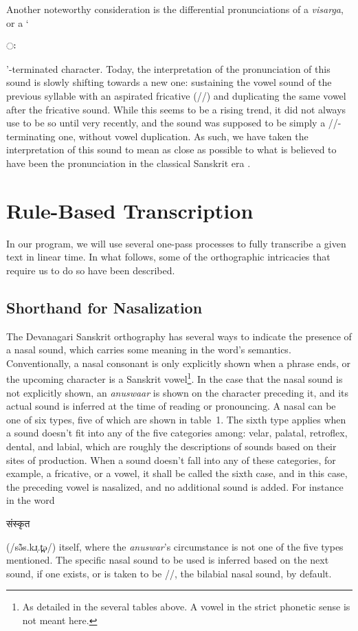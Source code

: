 \documentclass[10pt,a4paper]{article}
\let\ipa\textipa
\newcommand{\sansk}[1]{\begin{sanskrit}#1\end{sanskrit}}
\begin{document}
Another noteworthy consideration is the differential pronunciations of a {\it visarga}, or a `\sansk{ः}'-terminated character. Today, the interpretation of the pronunciation of this sound is slowly shifting towards a new one: sustaining the vowel sound of the previous syllable with an aspirated fricative (/{\it \ipa{h}}/) and duplicating the same vowel after the fricative sound. While this seems to be a rising trend, it did not always use to be so until very recently,  and the sound was supposed to be simply a {/\ipa{h}/}-terminating one, without vowel duplication. As such, we have taken the interpretation of this sound to mean as close as possible to what is believed to have been the pronunciation in the classical Sanskrit era \cite{zieba2002original}.

\section{Rule-Based Transcription}

In our program, we will use several one-pass processes to fully transcribe a given text in linear time. In what follows, some of the orthographic intricacies that require us to do so have been described.

\subsection{Shorthand for Nasalization}

The Devanagari Sanskrit orthography has several ways to indicate the presence of a nasal sound, which carries some meaning in the word's semantics. Conventionally, a nasal consonant is only explicitly shown when a phrase ends, or the upcoming character is a Sanskrit vowel\footnote{As detailed in the several tables above. A vowel in the strict phonetic sense is not meant here.}. In the case that the nasal sound is not explicitly shown, an {\it anuswaar} is shown on the character preceding it, and its actual sound is inferred at the time of reading or pronouncing. A nasal can be one of six types, five of which are shown in table~1. The sixth type applies when a sound doesn't fit into any of the five categories among: velar, palatal, retroflex, dental, and labial, which are roughly the descriptions of sounds based on their sites of production. When a sound doesn't fall into any of these categories, for example, a fricative, or a vowel, it shall be called the sixth case, and in this case, the preceding vowel is nasalized, and no additional sound is added. For instance in the word \sansk{संस्कृत} (/sə̃̃s.kɹ̩.t̪ə/) itself, where the {\it anuswar}'s circumstance is not one of the five types mentioned. The specific nasal sound to be used is inferred based on the next sound, if one exists, or is taken to be {/\ipa{m}/}, the bilabial nasal sound, by default.
\end{document}
